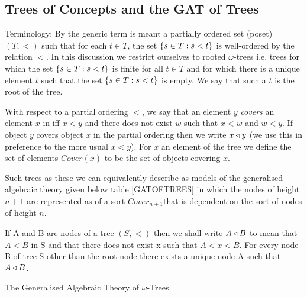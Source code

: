 \subsection {Trees of Concepts and the GAT of Trees}

\renewcommand{\highlight}[1]{#1}  %
 
Terminology: By  the generic term  is meant a partially ordered set (poset) $(T, <)$ such that for each $t \in T$, the set $\left\{s \in T : s < t\right\}$ is well-ordered by the relation $<$.
In this discussion we restrict ourselves to \highlight{rooted $\omega$-trees} i.e. trees for which the set $\left\{s \in T : s < t\right\}$
is finite for all $t \in T$ and for which there is a unique element $t$ such that
 the set $\left\{s \in T : s < t\right\}$ is empty. We say that such a $t$ is the root of the tree.

With respect to a partial ordering $<$, we say that \highlight{an element $y$ \textit{covers}  an element $x$} in  iff $x<y$ and there does not exist $w$ such that $x < w$ and $w < y$.
If object $y$ covers object $x$ in the partial ordering 
then we write \highlight{$x \triangleleft y$} (we use this in preference to the more usual $x \lessdot y$).
For $x$ an element of the tree we define the set of elements  \highlight{$Cover(x)$} to be the set of objects covering $x$.

Such trees as these we can equivalently describe as models of the generalised algebraic theory given below table \ref{GATOFTREES} in which the nodes of height $n+1$ are represented as of a sort $Cover_{n+1}$that is dependent on the sort of nodes of height $n$.

\newcommand{\Ft}[1]{\downarrow \kern -0.325em #1}
If A and B are nodes of  a tree $(S,<)$ then we shall write $A \triangleleft B$ to mean that $A < B$ in S and that
there does not exist x such that $A < x < B$. For every node B of tree S other than the root node there exists a unique node A such that $A \triangleleft B$.

\newcommand{\Sz}{Base}
\newcommand{\ofS}[1]{\ofT{#1}{\Sz}}
\newcommand{\Si}[1]{C\kern-1pt over_{#1}}
\newcommand{\ofSi}[3]{\ofT{#1}{\Si{#2}(#3)}}
\vspace{0.03cm} 
\begin{table}[H]
\caption{The Generalised Algebraic Theory of $\omega$-Trees}
\label{GATOFTREES}

\end{table} 

